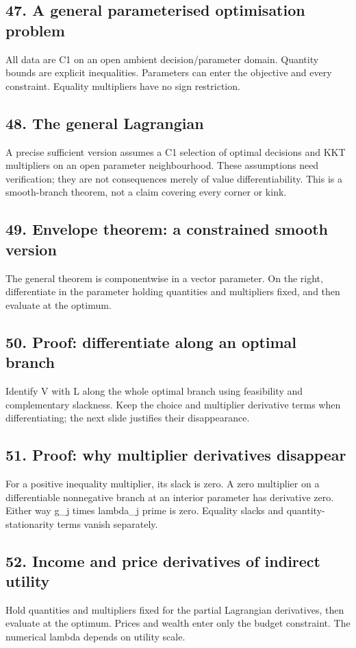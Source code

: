 \documentclass[11pt,a4paper]{article}
\begin{document}
\subsection*{47. A general parameterised optimisation problem}
All data are C1 on an open ambient decision/parameter domain. Quantity bounds are explicit inequalities. Parameters can enter the objective and every constraint. Equality multipliers have no sign restriction.

\subsection*{48. The general Lagrangian}
A precise sufficient version assumes a C1 selection of optimal decisions and KKT multipliers on an open parameter neighbourhood. These assumptions need verification; they are not consequences merely of value differentiability. This is a smooth-branch theorem, not a claim covering every corner or kink.

\subsection*{49. Envelope theorem: a constrained smooth version}
The general theorem is componentwise in a vector parameter. On the right, differentiate in the parameter holding quantities and multipliers fixed, and then evaluate at the optimum.

\subsection*{50. Proof: differentiate along an optimal branch}
Identify V with L along the whole optimal branch using feasibility and complementary slackness. Keep the choice and multiplier derivative terms when differentiating; the next slide justifies their disappearance.

\subsection*{51. Proof: why multiplier derivatives disappear}
For a positive inequality multiplier, its slack is zero. A zero multiplier on a differentiable nonnegative branch at an interior parameter has derivative zero. Either way g\_j times lambda\_j prime is zero. Equality slacks and quantity-stationarity terms vanish separately.

\subsection*{52. Income and price derivatives of indirect utility}
Hold quantities and multipliers fixed for the partial Lagrangian derivatives, then evaluate at the optimum. Prices and wealth enter only the budget constraint. The numerical lambda depends on utility scale.
\end{document}

